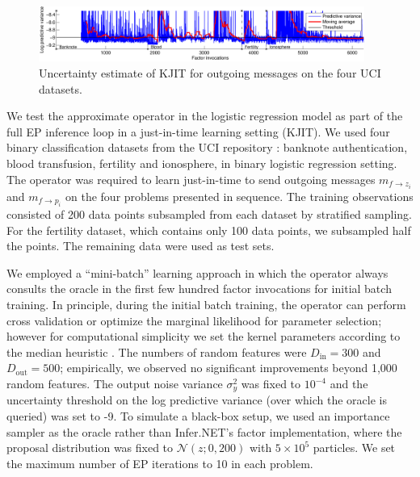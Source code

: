 \documentclass[english]{article}
\theoremstyle{plain}
\theoremstyle{plain}
\newcommand{\factor}{f}				%
\newcommand{\msg}[2]{m_{#1 \rightarrow #2}}			%
\begin{document}
\begin{figure}[t]
\centering
\includegraphics[width=0.95\textwidth]{online/uci_temporal_uncertainty-crop}
\caption{
Uncertainty estimate of KJIT for outgoing messages on the four UCI datasets.
\label{fig:uci_temporal_uncertainty}
}
\end{figure}




We test the approximate operator in the logistic regression
model as part of the full EP inference loop in a just-in-time learning setting
(KJIT). We used four binary classification datasets from the UCI repository
\citep{Lichm2013}: banknote authentication, blood transfusion, fertility and
ionosphere, in binary logistic regression setting. The
operator was required to learn just-in-time to send outgoing messages
$\msg{\factor}{z_i}$ and $\msg{\factor}{p_i}$ on the four problems presented in
sequence. The training observations consisted of 200 data points subsampled
from each dataset by stratified sampling.  For the fertility dataset, which
contains only 100 data points, we subsampled half the points. The remaining
data were used as test sets. 

We employed a ``mini-batch'' learning approach in which the operator always consults the oracle in
the first few hundred factor invocations for initial batch training. 
In principle, during the initial batch training, the operator can perform 
cross validation or optimize the marginal likelihood for parameter selection;
however for computational simplicity we set the kernel parameters according to
the median heuristic
\citep{Scholkopf2002}. 
The numbers 
of random features were $D_\mathrm{in} = 300$ and $D_\mathrm{out} = 500$; empirically, we observed
no significant improvements beyond 1,000 random features. The
output noise variance 
$\sigma^2_y$ was fixed to $10^{-4}$ and the uncertainty threshold on the log 
predictive variance (over which the oracle is queried) was set to -9. To
simulate a black-box setup, we used
an importance sampler as the oracle rather than Infer.NET's factor implementation, 
where the proposal distribution was fixed to $\mathcal{N}(z; 0, 200)$ with 
$5 \times 10^5$ particles. We set the
maximum number of EP iterations to 10 in each problem.
\end{document}
